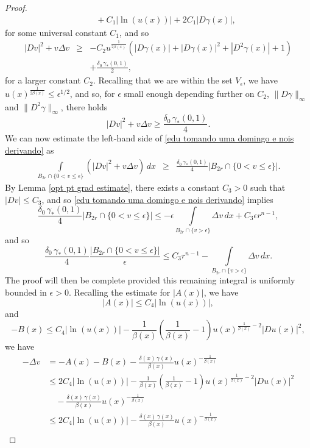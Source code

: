 \documentclass[10pt,a4paper]{amsart}
\begin{document}
\begin{proof}
\begin{align*}
	&  \quad + C_1|\ln(u(x))| + 2C_1 |D\gamma(x)|, 
\end{align*}
for some universal constant $C_1$, and so
\begin{eqnarray*}
         |Dv|^2 + v \Delta v & \geq & \displaystyle - C_2u^{\frac{1}{2\beta(x)}}\left(|D\gamma(x)| + |D\gamma(x)|^2 + |D^2\gamma(x)| + 1 \right)\\
         & &  + \frac{\delta_0 \, \gamma_\ast (0,1)}{2},
\end{eqnarray*}
for a larger constant $C_2$. Recalling that we are within the set $V_\epsilon$, we have $u(x)^{\frac{1}{2\beta(x)}} \leq \epsilon^{1/2}$, and so, for $\epsilon$ small enough depending further on $C_2$, $\|D\gamma\|_\infty$ and $\|D^2\gamma\|_\infty$, there holds
$$
	|Dv|^2 + v \Delta v \geq \frac{\delta_0 \, \gamma_\ast (0,1)}{4}.
$$
We can now estimate the left-hand side of \eqref{edu tomando uma domingo e nois derivando} as
\begin{eqnarray*}
         \int\limits_{B_{2r} \cap \{0 < v \leq \epsilon \} } \left(|Dv|^2 + v\Delta v\right)\,dx  & \geq &  \frac{\delta_0 \, \gamma_\ast (0,1)}{4}|B_{2r} \cap \{0 < v \leq \epsilon \}|.
\end{eqnarray*}
By Lemma \ref{opt pt grad estimate}, there exists a constant $C_3>0$ such that $|Dv| \leq C_3$, and so \eqref{edu tomando uma domingo e nois derivando} implies
$$
    \frac{\delta_0 \, \gamma_\ast (0,1)}{4}|B_{2r} \cap \{0 < v \leq \epsilon \}| \leq - \epsilon \int\limits_{B_{2r} \cap \{v > \epsilon \}}\Delta v\,dx + C_3 \epsilon r^{n-1},
$$
and so
$$
    \frac{\delta_0 \, \gamma_\ast (0,1)}{4}\frac{|B_{2r} \cap \{0 < v \leq \epsilon \}|}{\epsilon} \leq C_3r^{n-1} - \int\limits_{B_{2r} \cap \{v > \epsilon \}}\Delta v\,dx.
$$
The proof will then be complete provided this remaining integral is uniformly bounded in $\epsilon>0$. Recalling the estimate for $|A(x)|$, we have
$$
	|A(x)| \leq C_4|\ln(u(x))|,
$$
and 
$$
	-B(x) \leq C_4|\ln(u(x))| - \frac{1}{\beta(x)}\left(\frac{1}{\beta(x)} -1\right)u(x)^{\frac{1}{\beta(x)}-2}|Du(x)|^2,
$$
we have
\begin{align*}
        -\Delta v &  =   - A(x) - B(x) - \frac{\delta(x)\, \gamma(x)}{\beta(x)} u(x)^{-\frac{1}{\beta(x)}} \\
         & \leq   2C_4|\ln(u(x))| - \frac{1}{\beta(x)}\left(\frac{1}{\beta(x)} -1\right)u(x)^{\frac{1}{\beta(x)}-2}|Du(x)|^2 
         \\
         &  \quad - \frac{\delta(x)\, \gamma(x)}{\beta(x)} u(x)^{-\frac{1}{\beta(x)}}\\
         & \leq  2C_4|\ln(u(x))| - \frac{\delta(x)\, \gamma(x)}{\beta(x)} u(x)^{-\frac{1}{\beta(x)}}\\

\end{align*}
\end{proof}
\end{document}
